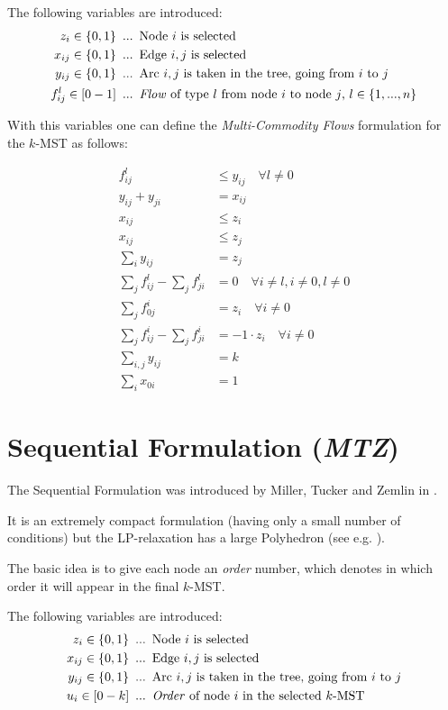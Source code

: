 \documentclass[11pt, oneside, a4paper, fleqn]{article}
\begin{document}
The following variables are introduced:
\begin{align*}
  z_i \in\{0,1\} & \enskip ... \enskip \text{Node $i$ is selected}\\
  x_{ij} \in\{0,1\} & \enskip ... \enskip\text{Edge $i,j$ is selected}\\
  y_{ij} \in\{0,1\} & \enskip ... \enskip\text{Arc $i,j$ is taken
             in the tree, going from $i$ to $j$} \\
  f^l_{ij} \in[0-1] & \enskip ... \enskip\text{\emph{Flow}
             of type $l$ from node $i$ to node $j$,
             $l \in \{1, ..., n\}$}
\end{align*}

With this variables one can define the \emph{Multi-Commodity Flows}
formulation for the $k$-MST as follows:

\begin{align}
  f^l_{ij} & \le y_{ij} \quad \forall l \ne 0 \\
  y_{ij} + y_{ji} & = x_{ij}\\
  x_{ij} & \le z_i \\
  x_{ij} & \le z_j \\
  \sum_{i}y_{ij} &= z_j \\
  \sum_{j}f^l_{ij} - \sum_{j}f^l_{ji} & = 0
           \quad \forall i \ne l, i \ne 0, l \ne 0 \\
  \sum_{j}f^i_{0j} & = z_i
           \quad \forall i \ne 0 \\
  \sum_{j}f^i_{ij} - \sum_{j}f^i_{ji} & = -1\cdot z_i
           \quad \forall i \ne 0 \\
  \sum_{i,j}y_{ij} & = k \\
  \sum_{i} x_{0i} & = 1
\end{align}

\section*{Sequential Formulation (\emph{MTZ})}

The Sequential Formulation was introduced by Miller, Tucker and
Zemlin in \cite{mtz1960}.

It is an extremely compact formulation (having only a small
number of conditions) but the LP-relaxation has a large Polyhedron
(see e.g. \cite{padberg1991}).

The basic idea is to give each node an \emph{order}
number, which denotes in which order it will appear in the
final $k$-MST.

The following variables are introduced:
\begin{align*}
  z_i \in\{0,1\} & \enskip ... \enskip \text{Node $i$ is selected}\\
  x_{ij} \in\{0,1\} & \enskip ... \enskip\text{Edge $i,j$ is selected}\\
  y_{ij} \in\{0,1\} & \enskip ... \enskip\text{Arc $i,j$ is taken
             in the tree, going from $i$ to $j$} \\
  u_{i} \in[0-k] & \enskip ... \enskip\text{\emph{Order}
             of node $i$ in the selected $k$-MST}
\end{align*}
\end{document}
